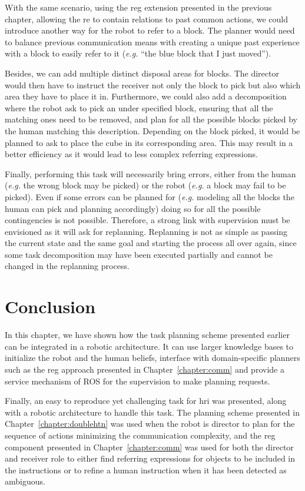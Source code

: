 \documentclass[a4paper,11pt,twoside]{StyleThese}
\begin{document}
With the same scenario, using the \acrshort{reg} extension presented in the previous chapter, allowing the \acrshort{re} to contain relations to past common actions, we could introduce another way for the robot to refer to a block. The planner would need to balance previous communication means with creating a unique past experience with a block to easily refer to it (\textit{e.g.} ``the blue block that I just moved'').

Besides, we can add multiple distinct disposal areas for blocks. The director would then have to instruct the receiver not only the block to pick but also which area they have to place it in. Furthermore, we could also add a decomposition where the robot ask to pick an under specified block, ensuring that all the matching ones need to be removed, and plan for all the possible blocks picked by the human matching this description. Depending on the block picked, it would be planned to ask to place the cube in its corresponding area. This may result in a better efficiency as it would lead to less complex referring expressions.

Finally, performing this task will necessarily bring errors, either from the human (\textit{e.g.} the wrong block may be picked) or the robot (\textit{e.g.} a block may fail to be picked). Even if some errors can be planned for (\textit{e.g.} modeling all the blocks the human can pick and planning accordingly) doing so for all the possible contingencies is not possible. Therefore, a strong link with supervision must be envisioned as it will ask for replanning. Replanning is not as simple as passing the current state and the same goal and starting the process all over again, since some task decomposition may have been executed partially and cannot be changed in the replanning process.


\section{Conclusion}
In this chapter, we have shown how the task planning scheme presented earlier can be integrated in a robotic architecture. It can use larger knowledge bases to initialize the robot and the human beliefs, interface with domain-specific planners such as the \acrshort{reg} approach presented in Chapter~\ref{chapter:comm} and provide a service mechanism of ROS for the supervision to make planning requests.

Finally, an easy to reproduce yet challenging task for \acrshort{hri} was presented, along with a robotic architecture to handle this task. The planning scheme presented in Chapter~\ref{chapter:doublehtn} was used when the robot is director to plan for the sequence of actions minimizing the communication complexity, and the \acrshort{reg} component presented in Chapter~\ref{chapter:comm} was used for both the director and receiver role to either find referring expressions for objects to be included in the instructions or to refine a human instruction when it has been detected as ambiguous.

\ifdefined{}
\else


\end{document}
